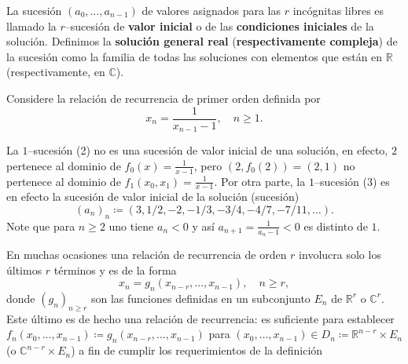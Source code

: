 La sucesión $\left(a_{0},\ldots,a_{n-1}\right)$ de valores asignados para las $r$ incógnitas libres es llamado la $r$--sucesión de \textbf{valor inicial} o de las \textbf{condiciones iniciales} de la solución. Definimos la \textbf{solución general real} (\textbf{respectivamente compleja}) de la sucesión como la familia de todas las soluciones con elementos que están en $\mathds{R}$ (respectivamente, en $\mathds{C}$).

\begin{example}{}
Considere la relación de recurrencia de primer orden definida por \[ x_{n}=\frac{1}{x_{n-1}-1},\quad n\geq1. \]
\end{example}
La $1$--sucesión (2) no es una sucesión de valor inicial de una solución, en efecto, $2$ pertenece al dominio de $f_{0}\left(x\right)=\frac{1}{x-1}$, pero $\left(2,f_{0}(2)\right)=\left(2,1\right)$ no pertenece al dominio de $f_{1}\left(x_{0},x_{1}\right)=\frac{1}{x-1}$. Por otra parte, la $1$--sucesión (3) es en efecto la sucesión de valor inicial de la solución (sucesión) \[ \left(a_{n}\right)_{n}\coloneqq\left(3,1/2,-2,-1/3,-3/4,-4/7,-7/11,\ldots\right). \]
Note que para $n\geq2$ uno tiene $a_{n}<0$ y así $a_{n+1}=\frac{1}{a_{n}-1}<0$ es distinto de $1$.

\begin{example}{}
En muchas ocasiones una relación de recurrencia de orden $r$ involucra solo los últimos $r$ términos y es de la forma
\begin{equation*}
x_{n}=g_{n}\left(x_{n-r},\ldots,x_{n-1}\right),\quad n\geq r,
\end{equation*}
donde ${\left(g_{n}\right)}_{n\geq r}$ son las funciones definidas en un subconjunto $E_{n}$ de $\mathds{R}^{r}$ o $\mathds{C}^{r}$. Este último es de hecho una relación de recurrencia: es suficiente para establecer $f_{n}\left(x_{0},\ldots,x_{n-1}\right)\coloneqq g_{n}\left(x_{n-r},\ldots,x_{n-1}\right)$ para $\left(x_{0},\ldots,x_{n-1}\right)\in D_{n}\coloneqq\mathds{R}^{n-r}\times E_{n}$ (o $\mathds{C}^{n-r}\times E_{n}$) a fin de cumplir los requerimientos de la definición %
\end{example}

